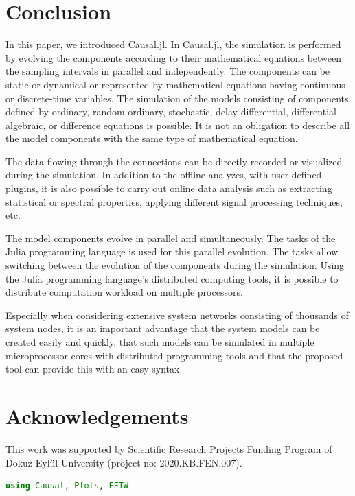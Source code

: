 \documentclass{juliacon}
\begin{document}
{\section{Conclusion}
In this paper, we introduced Causal.jl. In Causal.jl, the simulation is performed by evolving the components according to their mathematical equations between the sampling intervals in parallel and independently. The components can be static or dynamical or represented by mathematical equations having continuous or discrete-time variables. The simulation of the models consisting of components defined by ordinary, random ordinary, stochastic, delay differential, differential-algebraic, or difference equations is possible. It is not an obligation to describe all the model components with the same type of mathematical equation.

The data flowing through the connections can be directly recorded or visualized during the simulation. In addition to the offline analyzes, with user-defined plugins, it is also possible to carry out online data analysis such as extracting statistical or spectral properties, applying different signal processing techniques, etc. 

The model components evolve in parallel and simultaneously. The tasks of the Julia programming language is used for this parallel evolution. The tasks allow switching between the evolution of the components during the simulation. Using the Julia programming language's distributed computing tools, it is possible to distribute computation workload on multiple processors.

Especially when considering extensive system networks consisting of thousands of system nodes, it is an important advantage that the system models can be created easily and quickly, that such models can be simulated in multiple microprocessor cores with distributed programming tools and that the proposed tool can provide this with an easy syntax.

\section{Acknowledgements}
This work was supported by Scientific Research Projects Funding Program of Dokuz Eylül University (project no: 2020.KB.FEN.007).



\onecolumn
\appendix 

\begin{lstlisting}[caption={Program using Causal.jl for the simulation of the system in Figure \ref{fig: coupled model}. Plots.jl is used to plot the simulation data while FFTW.jl is used to compute the FFT of the simulation data \cite{plots, fftw}.}, label={lst: coupled codes}, language=Julia]
using Causal, Plots, FFTW


\end{lstlisting}}
\end{document}
